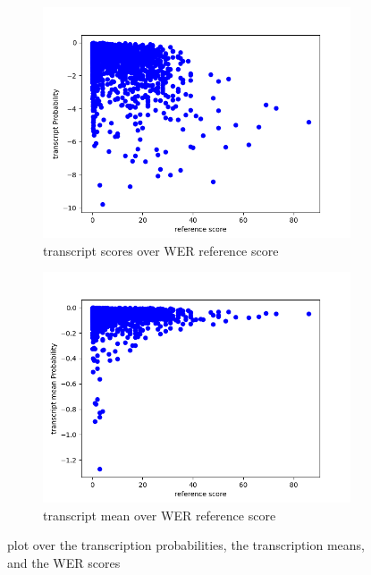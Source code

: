 \begin{figure}[ht]
    \centering%
    \begin{subfigure}{0.45\linewidth}
        \includegraphics[width=\textwidth]{Latex/sections/images/transcriptbasescore.png}
        \caption{transcript scores over WER reference score}
        \label{fig:transcript scatter plot base}
    \end{subfigure}
    \begin{subfigure}{0.45\linewidth}
        \includegraphics[width=\textwidth]{Latex/sections/images/transcriptmeanbasescore.png}
        \caption{transcript mean over WER reference score}
        \label{fig:transcript mean scatter plot}
    \end{subfigure}
    \caption{plot over the transcription probabilities, the transcription means, and the WER scores}
    \label{fig:transcript scatter plot}
\end{figure}

